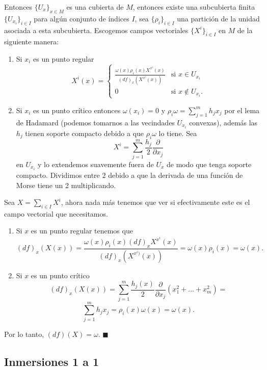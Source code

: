 \documentclass{report}
\theoremstyle{definition}
\begin{document}
Entonces $\{ U_x \}_{x \in M}$ es una cubierta de $M$, entonces existe una subcubierta finita $\{ U_{x_i} \}_{i \in I}$ para alg\'un conjunto de \'indices $I$, sea $\{ \rho_i \}_{i \in I}$ una partici\'on de la unidad asociada a esta subcubierta. Escogemos campos vectoriales $\{ X^{i} \}_{i \in I}$ en $M$ de la siguiente manera:

\begin{enumerate}
\item Si $x_i$ es un punto regular $$X^{i} (x) =
  \begin{cases}
		\frac{\omega(x) \rho_i (x) X^{x^{i}} (x)}{(df)_x (X^{x^{i}}(x)) }  & \mbox{si } x 	\in U_{x_i} \\
		0 & \mbox{si } x \notin U_{x_i} .
	\end{cases}$$
	
\item Si $x_i$ es un punto cr\'itico entonces $\omega(x_i) = 0$ y $\rho_i \omega = \sum\limits_{j=1}^m 	h_j x_j$ por el lema de Hadamard (podemos tomarnos a las vecindades $U_{x_i}$ convexas), adem\'as las $h_j$ tienen soporte compacto debido a que $\rho_i \omega$ lo tiene. Sea
$$X^{i} = \sum\limits_{j=1}^m \frac{h_j}{2} \frac{\partial}{\partial x_j}$$
en $U_{x_i}$ y lo extendemos suavemente fuera de $U_x$ de modo que tenga soporte compacto. Dividimos entre $2$ debido a que la derivada de una funci\'on de Morse tiene un 2 multiplicando.
\end{enumerate}

Sea $X = \sum\limits_{i \in I} X^{i}$, ahora nada m\'as tenemos que ver si efectivamente este es el campo vectorial que necesitamos.

\begin{enumerate}
\item Si $x $ es un punto regular tenemos que $$(df)_x(X(x)) = \frac{\omega (x) \rho_i (x) (df)_x X^{x^{i}} (x)}{(df)_x (X^{x^{i})} (x))} = \omega(x) \rho_i (x) = \omega (x) .$$

\item Si $x$ es un punto cr\'itico
$$(df)_x (X (x)) = \sum\limits_{j=1}^m \frac{h_j (x)}{2} \frac{\partial}{\partial x_j} (x_1^2 + \dots + x_m^2) =$$ $$ \sum\limits_{j=1}^m h_j x_j = \rho_i (x) \omega(x) = \omega(x) .$$

\end{enumerate}
Por lo tanto, $(df)(X) = \omega$. $\blacksquare$

\subsection{Inmersiones 1 a 1}
\end{document}
